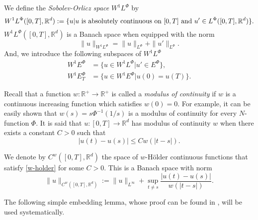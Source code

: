 \documentclass[twoside]{article}
\theoremstyle{remark}
\newcommand{\orlnor}{\|_{L^{\Phi}}}
\newcommand{\lphi}{L^{\Phi}}
\newcommand{\ephi}{E^{\Phi}}
\newcommand{\wphi}{W^{1}\lphi}
\newcommand{\wphie}{W^{1}\ephi}
\newcommand{\rr}{\mathbb{R}}
\renewcommand{\leq}{\leqslant}
\newcounter{example}
\begin{document}
We define the \emph{Sobolev-Orlicz space} $\wphi$ by
\[\wphi([0,T],\rr^d):=\{u| u \hbox{ is absolutely continuous on $[0,T]$ and } u'\in \lphi([0,T],\rr^d)\}.\]
$\wphi([0,T],\rr^d)$ is a Banach space when equipped with the norm
\begin{equation}\label{def-norma-orlicz-sob}
\|  u  \|_{\wphi}= \|  u  \|_{\lphi} + \|u'\orlnor.
\end{equation}
And, we introduce the following subspaces of $\wphi$
\begin{equation}\label{def-esp-orlicz-sob-per}
\begin{split}
\wphie&=\{u\in\wphi|u'\in\ephi\},\\
\wphie_T&=\{u\in\wphie|u(0)=u(T)\}.
\end{split}
\end{equation}

%
%



 Recall that a function   $w:\mathbb{R}^+\to \mathbb{R}^+$ is called  a \emph{modulus of continuity} if $w$ is a continuous increasing function which satisfies $w(0)=0$. For example, it can be easily shown that $w(s)=s\Phi^{-1}(1/s)$ is a modulus of  continuity for every $N$-function $\Phi$.  It is said that $u:[0,T]\to\rr^d$  has modulus of continuity $w$  when there exists a constant $C>0$ such that
\begin{equation}\label{w-holder}|u(t)-u(s)|\leq Cw(|t-s|).
\end{equation}


We denote by $C^w([0,T],\rr^d)$  the space of  $w$-H\"older continuous functions that satisfy  \eqref{w-holder} for some $C>0$. 
This is a Banach space with norm
\[\|u\|_{  C^w([0,T],\rr^d) }  :=\|u\|_{L^{\infty}}+\sup\limits_{t\neq s}\frac{|u(t)-u(s)|}{w(|t-s|)}.\]




The following simple  embedding lemma, whose proof can be found in \cite{ABGMS2015}, will be used systematically.
\end{document}
